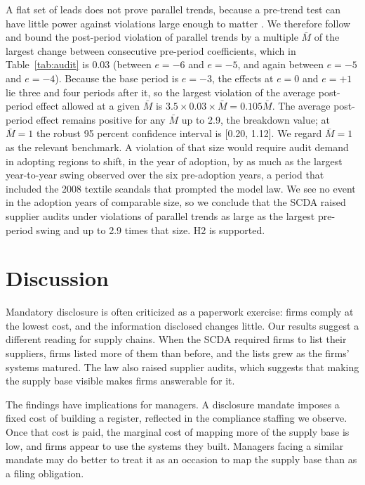 \documentclass[11pt]{article}
\begin{document}
A flat set of leads does not prove parallel trends, because a pre-trend test can have little power against violations large enough to matter \citep{roth2022}. We therefore follow \citet{rr2023} and bound the post-period violation of parallel trends by a multiple $\bar{M}$ of the largest change between consecutive pre-period coefficients, which in Table~\ref{tab:audit} is 0.03 (between $e = -6$ and $e = -5$, and again between $e = -5$ and $e = -4$). Because the base period is $e = -3$, the effects at $e = 0$ and $e = +1$ lie three and four periods after it, so the largest violation of the average post-period effect allowed at a given $\bar{M}$ is $3.5 \times 0.03 \times \bar{M} = 0.105\bar{M}$. The average post-period effect remains positive for any $\bar{M}$ up to 2.9, the breakdown value; at $\bar{M} = 1$ the robust 95 percent confidence interval is [0.20, 1.12]. We regard $\bar{M} = 1$ as the relevant benchmark. A violation of that size would require audit demand in adopting regions to shift, in the year of adoption, by as much as the largest year-to-year swing observed over the six pre-adoption years, a period that included the 2008 textile scandals that prompted the model law. We see no event in the adoption years of comparable size, so we conclude that the SCDA raised supplier audits under violations of parallel trends as large as the largest pre-period swing and up to 2.9 times that size. H2 is supported.

\section{Discussion}

Mandatory disclosure is often criticized as a paperwork exercise: firms comply at the lowest cost, and the information disclosed changes little. Our results suggest a different reading for supply chains. When the SCDA required firms to list their suppliers, firms listed more of them than before, and the lists grew as the firms' systems matured. The law also raised supplier audits, which suggests that making the supply base visible makes firms answerable for it.

The findings have implications for managers. A disclosure mandate imposes a fixed cost of building a register, reflected in the compliance staffing we observe. Once that cost is paid, the marginal cost of mapping more of the supply base is low, and firms appear to use the systems they built. Managers facing a similar mandate may do better to treat it as an occasion to map the supply base than as a filing obligation.
\end{document}
